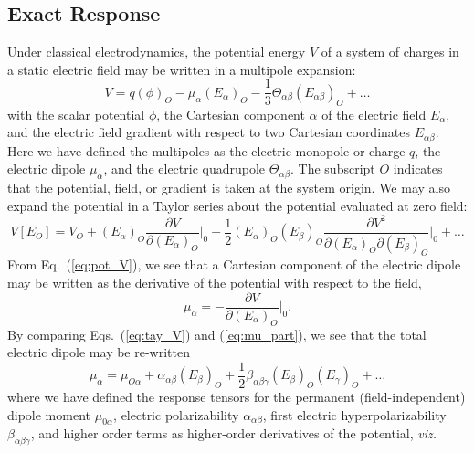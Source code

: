 \subsection{Exact Response} \label{ss:exact}
Under classical electrodynamics, the potential energy $V$ of a system of charges in a static electric field 
may be written in a multipole expansion:\cite{Barron2004}
\begin{equation} \label{eq:pot_V}
V = q(\phi)_O - \mu_\alpha(E_\alpha)_O - \frac{1}{3}\Theta_{\alpha\beta}(E_{\alpha\beta})_O + \ldots
\end{equation}
with the scalar potential $\phi$, 
the Cartesian component $\alpha$ of the electric field $E_\alpha$, and 
the electric field gradient with respect to two Cartesian coordinates $E_{\alpha\beta}$. 
Here we have defined the multipoles as the electric monopole or charge $q$, the electric dipole $\mu_\alpha$, and the electric quadrupole $\Theta_{\alpha\beta}$. 
The subscript $O$ indicates that the potential, field, or gradient is taken at the system origin.
We may also expand the potential in a Taylor series about the potential evaluated at zero field:
\begin{equation} \label{eq:tay_V}
    V[E_O] = V_O + (E_\alpha)_O\frac{\partial V}{\partial (E_\alpha)_O}\Bigr|_0 + \frac{1}{2}(E_\alpha)_O(E_\beta)_O\frac{\partial V^2}{\partial (E_\alpha)_O \partial (E_\beta)_O}\Bigr|_0 + \ldots
\end{equation}
From Eq.~(\ref{eq:pot_V}), we see that a Cartesian component of the electric dipole may be written as the derivative of the potential with respect to the field, 
\begin{equation} \label{eq:mu_part}
    \mu_\alpha = -\frac{\partial V}{\partial (E_\alpha)_O}\Bigr|_0.
\end{equation}
By comparing Eqs.~(\ref{eq:tay_V}) and (\ref{eq:mu_part}), we see that the total electric dipole may be re-written 
\begin{equation} \label{eq:mu_tot}
\mu_\alpha = \mu_{O\alpha} + \alpha_{\alpha\beta}(E_\beta)_O + \frac{1}{2}\beta_{\alpha\beta\gamma}(E_\beta)_O(E_\gamma)_O + \ldots
\end{equation}
where we have defined the response tensors for the permanent (field-independent) dipole moment $\mu_{0\alpha}$, electric polarizability $\alpha_{\alpha\beta}$, first electric hyperpolarizability $\beta_{\alpha\beta\gamma}$, and higher order terms as higher-order derivatives of the potential, \textit{viz.}
